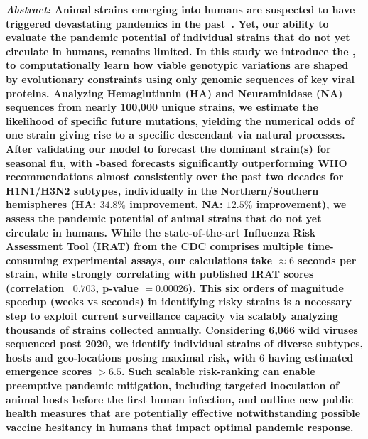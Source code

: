 \documentclass[onecolumn, compsoc,10pt]{IEEEtran}
\begin{document}
  
\maketitle

{\bf \sffamily \fontsize{10}{12}\selectfont \noindent   
  {\normalfont \itshape Abstract:} Animal \infl  strains emerging into humans are suspected to have triggered devastating  pandemics in the past~\cite{shao2017evolution,mills2004transmissibility,reid2003origin,landolt2007up}. Yet, our ability to evaluate the pandemic potential of individual strains that do not yet circulate in humans, remains limited. In this study we introduce the \enet, to computationally learn how viable genotypic variations are shaped by evolutionary constraints using only genomic sequences  of key viral proteins. Analyzing Hemaglutinnin (HA) and Neuraminidase (NA) sequences from nearly 100,000 unique strains, we estimate the likelihood of specific future mutations, yielding the numerical odds of one strain giving rise to a specific descendant via natural processes. After validating our model to forecast the dominant strain(s) for seasonal flu, with \enet-based forecasts significantly outperforming WHO recommendations almost consistently over the past two decades for H1N1/H3N2 subtypes, individually in the Northern/Southern hemispheres (HA: $34.8\% $ improvement, NA: $12.5\%$ improvement), we assess the pandemic potential of animal strains that do not yet circulate in humans. While the state-of-the-art Influenza Risk Assessment Tool (IRAT) from the CDC comprises multiple time-consuming experimental assays, our calculations take $\approx 6$ seconds per strain, while strongly correlating with published IRAT scores (correlation=$0.703$, p-value $= 0.00026$). This six orders of magnitude speedup (weeks vs seconds) in identifying risky strains is a necessary step to exploit  current surveillance capacity via scalably analyzing thousands of strains collected annually. Considering 6,066 wild \infl viruses sequenced post 2020, we identify individual strains of diverse subtypes, hosts and geo-locations posing maximal risk, with $6$ having estimated emergence scores $> 6.5$. Such scalable risk-ranking can enable preemptive pandemic mitigation, including targeted inoculation of animal hosts before the first human infection, and outline new public health measures that are potentially effective notwithstanding possible vaccine hesitancy in humans that impact optimal pandemic response.}
  
\vspace{10pt}
\end{document}
